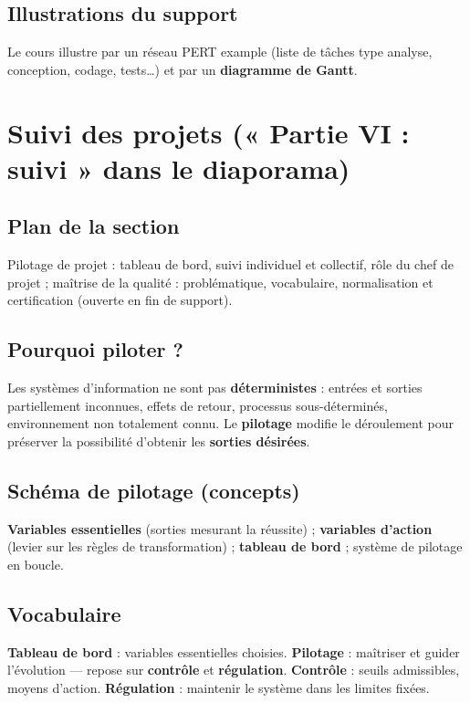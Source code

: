 \documentclass[11pt,a4paper]{article}
\begin{document}
\subsection{Illustrations du support}
Le cours illustre par un réseau PERT example (liste de tâches type analyse, conception, codage, tests\ldots) et par un \textbf{diagramme de Gantt}.

\section{Suivi des projets (« Partie VI : suivi » dans le diaporama)}

\subsection{Plan de la section}
Pilotage de projet : tableau de bord, suivi individuel et collectif, rôle du chef de projet ; maîtrise de la qualité : problématique, vocabulaire, normalisation et certification (ouverte en fin de support).

\subsection{Pourquoi piloter ?}
Les systèmes d'information ne sont pas \textbf{déterministes} : entrées et sorties partiellement inconnues, effets de retour, processus sous-déterminés, environnement non totalement connu. Le \textbf{pilotage} modifie le déroulement pour préserver la possibilité d'obtenir les \textbf{sorties désirées}.

\subsection{Schéma de pilotage (concepts)}
\textbf{Variables essentielles} (sorties mesurant la réussite) ; \textbf{variables d'action} (levier sur les règles de transformation) ; \textbf{tableau de bord} ; système de pilotage en boucle.

\subsection{Vocabulaire}
\textbf{Tableau de bord} : variables essentielles choisies. \textbf{Pilotage} : maîtriser et guider l'évolution — repose sur \textbf{contrôle} et \textbf{régulation}. \textbf{Contrôle} : seuils admissibles, moyens d'action. \textbf{Régulation} : maintenir le système dans les limites fixées.
\end{document}
